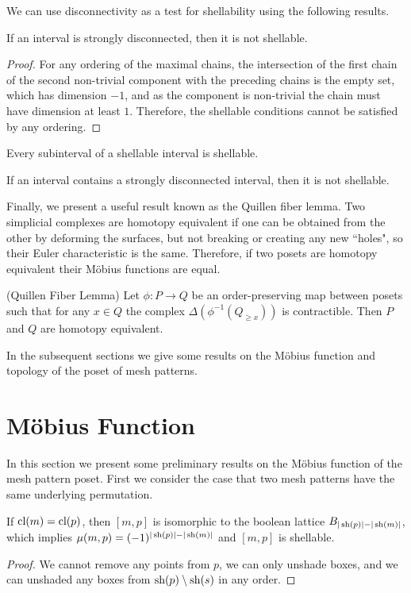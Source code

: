 \documentclass[11pt,a4paper,oneside]{article}
\begin{document}
We can use disconnectivity as a test for shellability using the following results.

\begin{lem}
If an interval is strongly disconnected, then it is not shellable.
\begin{proof}
For any ordering of the maximal chains, the intersection of the first chain of the second non-trivial 
component with the preceding chains is the empty set, which has dimension $-1$, and as the component is 
non-trivial the chain must have dimension at least $1$. Therefore, the shellable conditions cannot be 
satisfied by any ordering.
\end{proof}
\end{lem}

\begin{lem}\cite[Corollary 3.1.9]{Wac07}
Every subinterval of a shellable interval is shellable.
\end{lem}

\begin{cor}
If an interval contains a strongly disconnected interval, then it is not shellable.
\end{cor}

Finally, we present a useful result known as the Quillen fiber lemma. Two simplicial complexes are homotopy equivalent  if one can be obtained from the other by deforming the surfaces, but not breaking or creating any new ``holes", so their Euler characteristic is the same. Therefore, if two posets are homotopy equivalent their M\"obius functions are equal.
\begin{prop}\label{thm:Quil}(Quillen Fiber Lemma)
Let $\phi:P\rightarrow Q$ be an order-preserving map between posets such that for any
 $x\in Q$ the complex $\Delta(\phi^{-1}(Q_{\ge x}))$ is contractible.
  Then $P$ and $Q$ are homotopy equivalent.
\end{prop}

In the subsequent sections we give some results on the M\"obius function and topology of the poset of mesh patterns.



\section{M\"obius Function}\label{sec:MF}
In this section we present some preliminary results on the M\"obius function of the mesh pattern poset.
First we consider the case that two mesh patterns have the same underlying
permutation.
\begin{lem}
If $\operatorname{\textrm{cl}}(m)=\operatorname{\textrm{cl}}(p)$, then $[m,p]$ is isomorphic to the boolean lattice
$B_{|\operatorname{\textrm{sh}}(p)|-|\operatorname{\textrm{sh}}(m)|}$, which implies $\mu(m,p)=(-1)^{|\operatorname{\textrm{sh}}(p)|-|\operatorname{\textrm{sh}}(m)|}$ and
$[m,p]$ is shellable.
\begin{proof}
We cannot remove any points from $p$, we can only unshade boxes, and we can
unshaded any boxes from $\operatorname{\textrm{sh}}(p)\setminus\operatorname{\textrm{sh}}(s)$ in any order.
\end{proof}
\end{lem}
\end{document}
